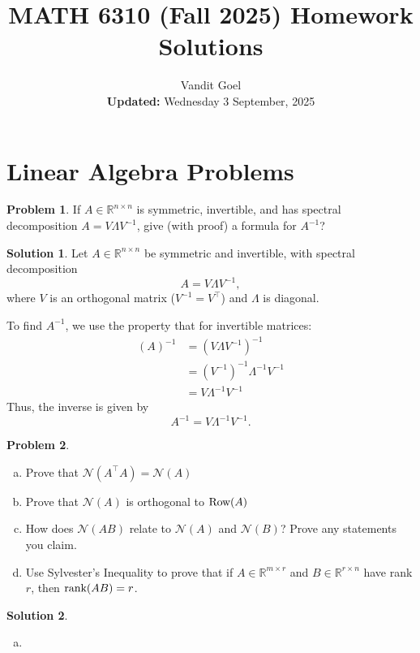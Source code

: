 \documentclass{amsart}[11pt]
\title{MATH 6310 (Fall 2025) Homework Solutions}
\author{Vandit Goel\\\textbf{Updated:} Wednesday  3 September, 2025}
\theoremstyle{definition}
\newtheorem{problem}{Problem}
\newtheorem{solution}{Solution}
\newcommand{\R}{\mathbb{R}}
\newcommand{\row}{\textnormal{Row}}
\newcommand{\rank}{\textnormal{rank}}
\begin{document}
\maketitle

\section{Linear Algebra Problems}

\begin{problem}
If $A\in\R^{n\times n}$ is symmetric, invertible, and has spectral decomposition $A=V\Lambda V^{-1}$, give (with proof) a formula for $A^{-1}$?

\begin{solution}
Let $A \in \mathbb{R}^{n \times n}$ be symmetric and invertible, with spectral decomposition
\[
A = V \Lambda V^{-1},
\]
where $V$ is an orthogonal matrix ($V^{-1} = V^\top$) and $\Lambda$ is diagonal.

\vspace{\baselineskip}
\noindent To find $A^{-1}$, we use the property that for invertible matrices:
\begin{align*}
	(A)^{-1} &= (V \Lambda V^{-1})^{-1} \\
	&= (V^{-1})^{-1}\Lambda^{-1} V^{-1} \\
	&= V\Lambda^{-1} V^{-1}
\end{align*}
Thus, the inverse is given by
\[
A^{-1} = V \Lambda^{-1} V^{-1}.
\]
\end{solution}
\end{problem}


\begin{problem}
\begin{enumerate}[(a)]
    \item Prove that $\mathcal{N}(A^\top A)=\mathcal{N}(A)$
    \item Prove that $\mathcal{N}(A)$ is orthogonal to $\row(A)$
    \item How does $\mathcal{N}(AB)$ relate to $\mathcal{N}(A)$ and $\mathcal{N}(B)$? Prove any statements you claim.
    \item Use Sylvester's Inequality to prove that if $A\in\R^{m\times r}$ and $B\in\R^{r\times n}$ have rank $r$, then $\rank(AB)=r$.
\end{enumerate}
\begin{solution}
    \begin{enumerate}[(a)]
    \item 
    \end{enumerate}
\end{solution}
\end{problem}
\end{document}
